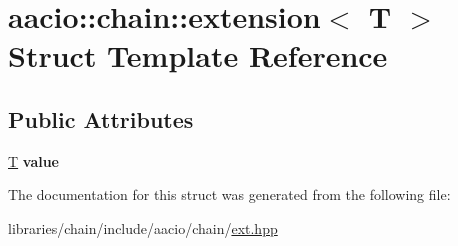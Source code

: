 \hypertarget{structaacio_1_1chain_1_1extension}{}\section{aacio\+:\+:chain\+:\+:extension$<$ T $>$ Struct Template Reference}
\label{structaacio_1_1chain_1_1extension}
\subsection*{Public Attributes}
\begin{DoxyCompactItemize}
\item 
\mbox{\label{structaacio_1_1chain_1_1extension_a1623879c2b4d2fdc4e723ccbae4b6342}} 
\mbox{\hyperlink{struct_t}{T}} {\bfseries value}
\end{DoxyCompactItemize}


The documentation for this struct was generated from the following file\+:\begin{DoxyCompactItemize}
\item 
libraries/chain/include/aacio/chain/\mbox{\hyperlink{ext_8hpp}{ext.\+hpp}}\end{DoxyCompactItemize}

